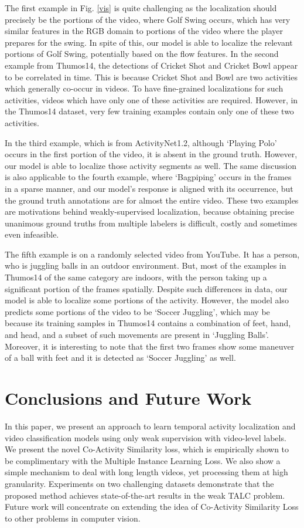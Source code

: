 \documentclass[runningheads]{llncs}
\begin{document}
The first example in Fig. \ref{vis} is quite challenging as the localization should precisely be the portions of the video, where Golf Swing occurs, which has very similar features in the RGB domain to portions of the video where the player prepares for the swing. In spite of this, our model is able to localize the relevant portions of Golf Swing, potentially based on the flow features. In the second example from Thumos14, the detections of Cricket Shot and Cricket Bowl appear to be correlated in time. This is because Cricket Shot and Bowl are two activities which generally co-occur in videos. To have fine-grained localizations for such activities, videos which have only one of these activities are required. However, in the Thumos14 dataset, very few training examples contain only one of these two activities. 

In the third example, which is from ActivityNet1.2, although `Playing Polo' occurs in the first portion of the video, it is absent in the ground truth. However, our model is able to localize those activity segments as well. The same discussion is also applicable to the fourth example, where `Bagpiping' occurs in the frames in a sparse manner, and our model's response is aligned with its occurrence, but the ground truth annotations are for almost the entire video. These two examples are motivations behind weakly-supervised localization, because obtaining precise unanimous ground truths from multiple labelers is difficult, costly and sometimes even infeasible.

The fifth example is on a randomly selected video from YouTube. It has a person, who is juggling balls in an outdoor environment. But, most of the examples in Thumos14 of the same category are indoors, with the person taking up a significant portion of the frames spatially. Despite such differences in data, our model is able to localize some portions of the activity. However, the model also predicts some portions of the video to be `Soccer Juggling', which may be because its training samples in Thumos14 contains a combination of feet, hand, and head, and a subset of such movements are present in `Juggling Balls'. Moreover, it is interesting to note that the first two frames show some maneuver of a ball with feet and it is detected as `Soccer Juggling' as well.

\section{Conclusions and Future Work}
In this paper, we present an approach to learn temporal activity localization and video classification models using only weak supervision with video-level labels. We present the novel Co-Activity Similarity loss, which is empirically shown to be complimentary with the Multiple Instance Learning Loss. We also show a simple mechanism to deal with long length videos, yet processing them at high granularity. Experiments on two challenging datasets demonstrate that the proposed method achieves state-of-the-art results in the weak TALC problem. Future work will concentrate on extending the idea of Co-Activity Similarity Loss to other problems in computer vision.
\end{document}
